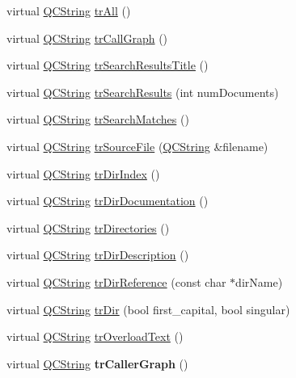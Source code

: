 \begin{DoxyCompactItemize}
virtual \hyperlink{class_q_c_string}{Q\-C\-String} \hyperlink{class_translator_slovak_afba06c0d2fb2ce2775c541d44b805758}{tr\-All} ()
\item 
virtual \hyperlink{class_q_c_string}{Q\-C\-String} \hyperlink{class_translator_slovak_a5eb7947fa59555756d25476f922cde01}{tr\-Call\-Graph} ()
\item 
virtual \hyperlink{class_q_c_string}{Q\-C\-String} \hyperlink{class_translator_slovak_a711c6a2b5461f1f055d00611ea3a0533}{tr\-Search\-Results\-Title} ()
\item 
virtual \hyperlink{class_q_c_string}{Q\-C\-String} \hyperlink{class_translator_slovak_ae43fbd8a6b08b331a6586422bd8c465e}{tr\-Search\-Results} (int num\-Documents)
\item 
virtual \hyperlink{class_q_c_string}{Q\-C\-String} \hyperlink{class_translator_slovak_a0677855fd52afcda6d47b2cc51e7de31}{tr\-Search\-Matches} ()
\item 
virtual \hyperlink{class_q_c_string}{Q\-C\-String} \hyperlink{class_translator_slovak_a1b3571c6c75d16ebe3763f510bd95b68}{tr\-Source\-File} (\hyperlink{class_q_c_string}{Q\-C\-String} \&filename)
\item 
virtual \hyperlink{class_q_c_string}{Q\-C\-String} \hyperlink{class_translator_slovak_ae9895001e5d8629fd068895b2ffa653f}{tr\-Dir\-Index} ()
\item 
virtual \hyperlink{class_q_c_string}{Q\-C\-String} \hyperlink{class_translator_slovak_a89a223d69d1255271719c256b2fd451b}{tr\-Dir\-Documentation} ()
\item 
virtual \hyperlink{class_q_c_string}{Q\-C\-String} \hyperlink{class_translator_slovak_ab7610b46aedb923a1524272dfbaeab38}{tr\-Directories} ()
\item 
virtual \hyperlink{class_q_c_string}{Q\-C\-String} \hyperlink{class_translator_slovak_abf769d2a217fcf6b9d3b9170fbbae7c8}{tr\-Dir\-Description} ()
\item 
virtual \hyperlink{class_q_c_string}{Q\-C\-String} \hyperlink{class_translator_slovak_ae680136bec0ce1d29a1e4e00d871797f}{tr\-Dir\-Reference} (const char $\ast$dir\-Name)
\item 
virtual \hyperlink{class_q_c_string}{Q\-C\-String} \hyperlink{class_translator_slovak_abb2b35bd374b96530198bf061054c951}{tr\-Dir} (bool first\-\_\-capital, bool singular)
\item 
virtual \hyperlink{class_q_c_string}{Q\-C\-String} \hyperlink{class_translator_slovak_ac5436cb286c48cd540d0cdce200a82b9}{tr\-Overload\-Text} ()
\item 
\hypertarget{class_translator_slovak_ae1d7d38cc426cd25124b1658b1125841}{virtual \hyperlink{class_q_c_string}{Q\-C\-String} {\bfseries tr\-Caller\-Graph} ()}\label{class_translator_slovak_ae1d7d38cc426cd25124b1658b1125841}


\end{DoxyCompactItemize}
